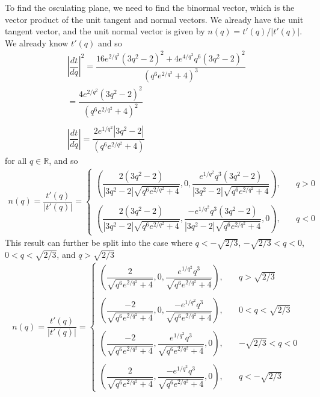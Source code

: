 \documentclass{article}
\newcommand{\R}{\mathbb{R}}
\begin{document}
	To find the osculating plane, we need to find the binormal vector, which is the vector product of the unit tangent and normal vectors. We already have the unit tangent vector, and the unit normal vector is given by $n(q) = t'(q)/|t'(q)|$. We already know $t'(q)$ and so
	\begin{gather*}
		\left| \dfrac{dt}{dq} \right|^2 = \dfrac{16 e^{2/q^2} (3q^2 - 2)^2 + 4 e^{4/q^2} q^6 (3q^2 - 2)^2 }{ ( q^6 e^{2/q^2} + 4 )^3 } \\
		= \dfrac{ 4 e^{2/q^2} (3q^2 - 2)^2 }{ ( q^6 e^{2/q^2} + 4 )^2 } \\ \\
		\left| \dfrac{dt}{dq} \right| = \dfrac{ 2 e^{1/q^2} |3q^2 - 2| }{ ( q^6 e^{2/q^2} + 4 ) }
	\end{gather*}
	for all $q \in \R$, and so
	\begin{gather*}
		n(q) = \dfrac{t'(q)}{|t'(q)|} = \begin{cases}
			\left( \dfrac{ 2(3q^2 - 2) }{ |3q^2 - 2| \sqrt{ q^6 e^{2/q^2} + 4 } }, 0, \dfrac{ e^{1/q^2}q^3(3q^2 - 2) }{ |3q^2 - 2| \sqrt{ q^6 e^{2/q^2} + 4 } } \right), \quad &q > 0
			\\ \\
			\left( \dfrac{ 2(3q^2 - 2) }{ |3q^2 - 2| \sqrt{ q^6 e^{2/q^2} + 4 } }, \dfrac{ -e^{1/q^2}q^3(3q^2 - 2) }{ |3q^2 - 2| \sqrt{ q^6 e^{2/q^2} + 4 } }, 0 \right), \quad &q < 0
		\end{cases}
	\end{gather*}
	This result can further be split into the case where $q < -\sqrt{2/3}$, $-\sqrt{2/3} < q < 0$, $0 < q < \sqrt{2/3}$, and $q > \sqrt{2/3}$
	\begin{gather*}
		n(q) = \dfrac{t'(q)}{|t'(q)|} = \begin{cases}
			\left( \dfrac{ 2 }{ \sqrt{ q^6 e^{2/q^2} + 4 } }, 0, \dfrac{ e^{1/q^2}q^3 }{ \sqrt{ q^6 e^{2/q^2} + 4 } } \right), \quad &q > \sqrt{2/3}
			\\ \\
			\left( \dfrac{ -2 }{ \sqrt{ q^6 e^{2/q^2} + 4 } }, 0, \dfrac{ -e^{1/q^2}q^3 }{ \sqrt{ q^6 e^{2/q^2} + 4 } } \right), \quad &0 < q < \sqrt{2/3}
			\\ \\
			\left( \dfrac{ -2 }{ \sqrt{ q^6 e^{2/q^2} + 4 } }, \dfrac{ e^{1/q^2}q^3 }{ \sqrt{ q^6 e^{2/q^2} + 4 } }, 0 \right), \quad &-\sqrt{2/3} < q < 0 \\ \\
			\left( \dfrac{ 2 }{ \sqrt{ q^6 e^{2/q^2} + 4 } }, \dfrac{ -e^{1/q^2}q^3 }{ \sqrt{ q^6 e^{2/q^2} + 4 } }, 0 \right), \quad &q < -\sqrt{2/3}
		\end{cases}
	\end{gather*}
\end{document}
